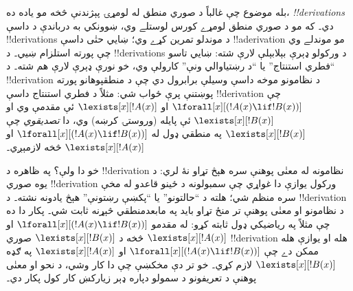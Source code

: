 \documentclass[../../../include/open-logic-section]{subfiles}
\begin{document}
بله موضوع چې غالباً د صوري منطق له لومړۍ پېژندنې څخه مو ياده ده،
\emph{!!{derivation}s} دي۔ که مو د صوري منطق لومړے کورس لوستلے وي،
ښوونکي به درباندې د داسې !!{derivation}s د موندلو تمرين کړے وي؛
ښايي حتٰی داسې !!a{derivation} مو موندلے وي چې پورته استلزام
ښيي۔ د !!{derivation}s د ورکولو ډېرې بېلابېلې لارې شته: ښايي تاسو
``فطري استنتاج'' يا ``د رښتياوالي ونې'' کارولې وي، خو نورې ډېرې
لارې هم شته۔ د !!{derivation} د نظامونو موخه داسې وسيلې برابرول دي
چې د منطقپوهانو پورته پوښتنې پرې ځواب شي: مثلاً د فطري استنتاج داسې
!!{derivation} چې $\lforall[x][(!A(x) \lif !B(x))]$ او
$\lexists[x][!A(x)]$ ئې مقدمې وي او $\lexists[x][!B(x)]$ ئې پايله
(وروستۍ کرښه) وي، دا \emph{تصديقوي} چې $\lexists[x][!B(x)]$ په
منطقي ډول له $\lforall[x][(!A(x) \lif !B(x))]$ او
$\lexists[x][!A(x)]$ څخه لازمېږي۔

خو دا ولې؟ په ظاهره د !!{derivation} نظامونه له معنٰی پوهنې سره
هېڅ تړاو نۀ لري: د يوه صوري !!{derivation} ورکول يوازې دا غواړي چې
سمبولونه د ځينو قاعدو له مخې سره منظم شي؛ هلته د ``حالتونو'' يا
``پکښې رښتونې'' هېڅ يادونه نشته۔ د !!{derivation} د نظامونو او
معنٰی پوهنې تر منځ تړاو بايد په مابعدمنطقي څېړنه ثابت شي۔ پکار دا
ده چې مثلاً په رياضيکي ډول ثابته کړو: له مقدمو
$\lforall[x][(!A(x) \lif !B(x))]$ او $\lexists[x][!A(x)]$ څخه د
$\lexists[x][!B(x)]$ صوري !!{derivation} هله او يوازې هله ممکن دے
چې $\lforall[x][(!A(x) \lif !B(x))]$ او
$\lexists[x][!A(x)]$ په ګډه $\lexists[x][!B(x)]$ لازم کړي۔ خو تر دې مخکښې چې دا کار وشي، د نحو او معنٰی پوهنې د تعريفونو
د سمولو دپاره ډېر زيارکښ کار کول پکار دي۔
\end{document}
